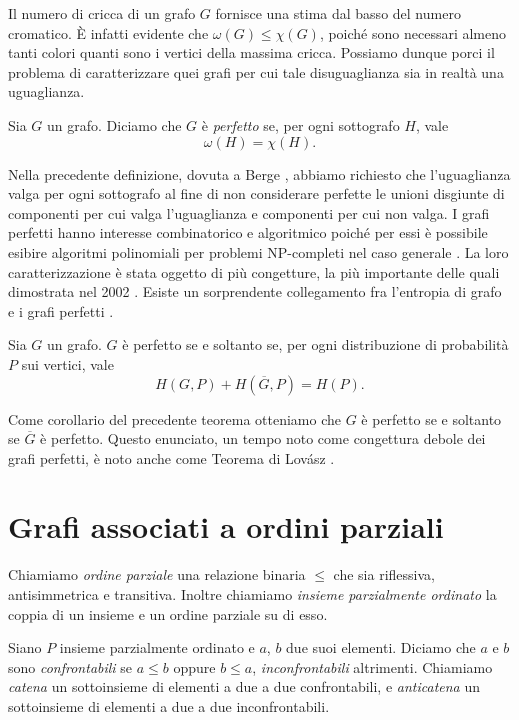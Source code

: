 Il numero di cricca di un grafo \(G\) fornisce una stima dal basso del numero cromatico. È infatti evidente che \(\omega(G)\le\chi(G)\), poiché sono necessari almeno tanti colori quanti sono i vertici della massima cricca. Possiamo dunque porci il problema di caratterizzare quei grafi per cui tale disuguaglianza sia in realtà una uguaglianza. 
\begin{definition}
	Sia \(G\) un grafo. Diciamo che \(G\) è \emph{perfetto} se, per ogni sottografo \(H\), vale
	\[\omega(H)=\chi(H).\]
\end{definition}
Nella precedente definizione, dovuta a Berge \cite{Berge1960}, abbiamo richiesto che l'uguaglianza valga per ogni sottografo al fine di non considerare perfette le unioni disgiunte di componenti per cui valga l'uguaglianza e componenti per cui non valga. I grafi perfetti hanno interesse combinatorico e algoritmico poiché per essi è possibile esibire algoritmi polinomiali per problemi NP-completi nel caso generale \cite{Golumbic2004}. La loro caratterizzazione è stata oggetto di più congetture, la più importante delle quali dimostrata nel 2002 \cite{Chudnovsky2006}. Esiste un sorprendente collegamento fra l'entropia di grafo e i grafi perfetti \cite{Csiszar1990}. 
\begin{theorem}
	 \label{lovasztheorem} Sia \(G\) un grafo. \(G\) è perfetto se e soltanto se, per ogni distribuzione di probabilità \(P\) sui vertici, vale
	\[H\left(G,P\right)+H\left(\overline{G},P\right)=H(P).\]
\end{theorem}
Come corollario del precedente teorema otteniamo che \(G\) è perfetto se e soltanto se \(\overline{G}\) è perfetto. Questo enunciato, un tempo noto come congettura debole dei grafi perfetti, è noto anche come Teorema di Lovász \cite{Lovasz1972}.

\section{Grafi associati a ordini parziali}

\begin{definition}
  Chiamiamo \emph{ordine parziale} una relazione binaria \(\le\) che sia riflessiva, antisimmetrica e transitiva. Inoltre chiamiamo \emph{insieme parzialmente ordinato} la coppia di un insieme e un ordine parziale su di esso.
\end{definition}

Siano \(P\) insieme parzialmente ordinato e \(a\), \(b\) due suoi elementi. Diciamo che \(a\) e \(b\) sono \emph{confrontabili} se \(a\le b\) oppure \(b\le a\), \emph{inconfrontabili} altrimenti. Chiamiamo \emph{catena} un sottoinsieme di elementi a due a due confrontabili, e \emph{anticatena} un sottoinsieme di elementi a due a due inconfrontabili.

